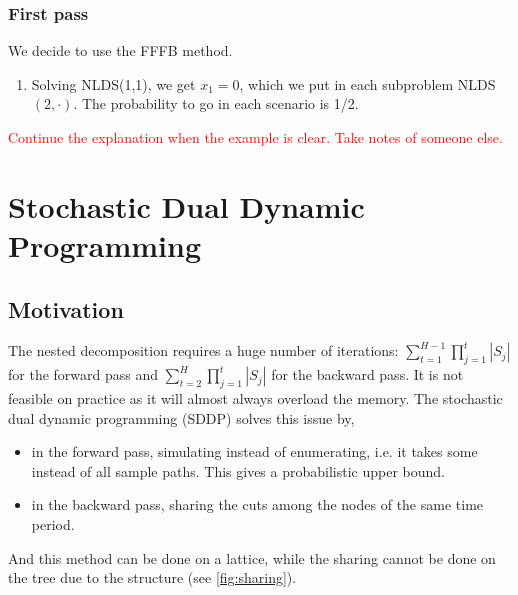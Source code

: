 \documentclass[12pt, openany]{report}
\theoremstyle{definition}
\begin{document}
\subsection{First pass}
We decide to use the FFFB method. 
\begin{enumerate}
	\item Solving NLDS(1,1), we get $x_1=0$, which we put in each subproblem NLDS$(2,\cdot)$. The probability to go in each scenario is 1/2. 
\end{enumerate}
\textcolor{red}{Continue the explanation when the example is clear. Take notes of someone else.}
\chapter{Stochastic Dual Dynamic Programming}
\section{Motivation}
The nested decomposition requires a huge number of iterations: $\sum_{t=1}^{H-1}\prod_{j=1}^t|S_j|$ for the forward pass and $\sum_{t=2}^H \prod_{j=1}^t |S_j|$ for the backward pass. It is not feasible on practice as it will almost always overload the memory. The stochastic dual dynamic programming (SDDP) solves this issue by,
\begin{itemize}
	\item in the forward pass, simulating instead of enumerating, i.e. it takes some instead of all sample paths. This gives a probabilistic upper bound. 
	\item in the backward pass, sharing the cuts among the nodes of the same time period.
\end{itemize}
And this method can be done on a lattice, while the sharing cannot be done on the tree due to the structure (see \ref{fig:sharing}).
\end{document}
